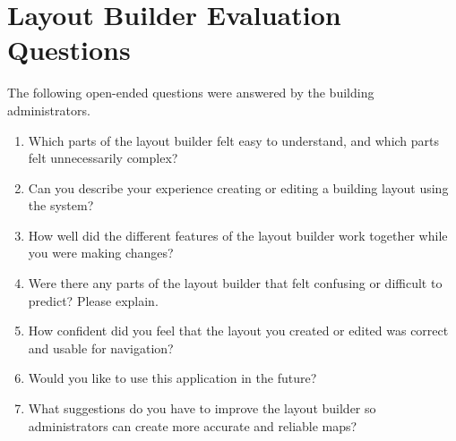 \chapter[LAYOUT BUILDER EVALUATION QUESTIONS]{Layout Builder Evaluation Questions}\label{app:C}

The following open-ended questions were answered by the building administrators.

\begin{enumerate}
\def\labelenumi{\arabic{enumi}.}
\item
  Which parts of the layout builder felt easy to understand, and which parts
  felt unnecessarily complex?
\item
  Can you describe your experience creating or editing a building layout using
  the system?
\item
  How well did the different features of the layout builder work together while
  you were making changes?
\item
  Were there any parts of the layout builder that felt confusing or difficult to
  predict? Please explain.
\item
  How confident did you feel that the layout you created or edited was correct
  and usable for navigation?
\item
  Would you like to use this application in the future?
\item
  What suggestions do you have to improve the layout builder so administrators
  can create more accurate and reliable maps?
\end{enumerate}
